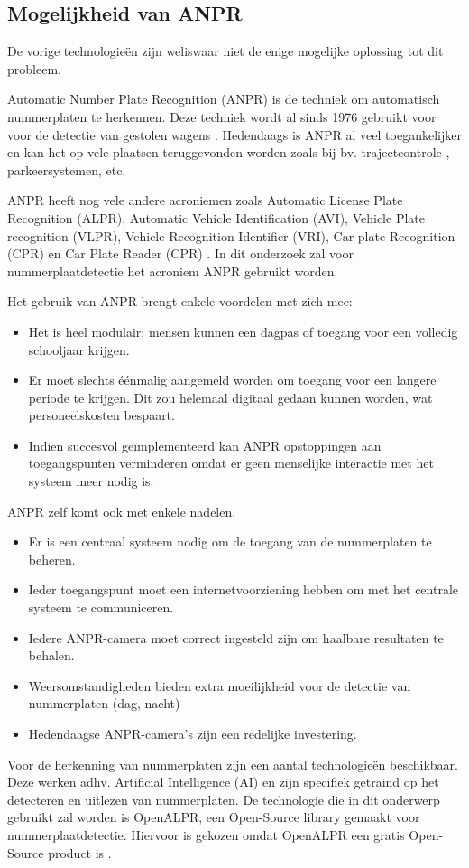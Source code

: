 \subsection{Mogelijkheid van ANPR}
De vorige technologieën zijn weliswaar niet de enige mogelijke oplossing tot dit probleem.

Automatic Number Plate Recognition (ANPR) is de techniek om automatisch nummerplaten te herkennen. Deze techniek wordt al sinds 1976 gebruikt voor voor de detectie van gestolen wagens \autocite{uk2011anpr}. Hedendaags is ANPR al veel toegankelijker en kan het op vele plaatsen teruggevonden worden zoals bij bv. trajectcontrole \autocite{de2014snelheidscamera}, parkeersystemen, etc.
\par
ANPR heeft nog vele andere acroniemen zoals Automatic License Plate Recognition (ALPR), Automatic Vehicle Identification (AVI), Vehicle Plate recognition (VLPR), Vehicle Recognition Identifier (VRI), Car plate Recognition (CPR) en Car Plate Reader (CPR) \autocite{axis2019license}. In dit onderzoek zal voor nummerplaatdetectie het acroniem ANPR gebruikt worden.
\par
Het gebruik van ANPR brengt enkele voordelen met zich mee:
\begin{itemize}
	\item Het is heel modulair; mensen kunnen een dagpas of toegang voor een volledig schooljaar krijgen.
	\item Er moet slechts éénmalig aangemeld worden om toegang voor een langere periode te krijgen. Dit zou helemaal digitaal gedaan kunnen worden, wat personeelskosten bespaart.
	\item Indien succesvol geïmplementeerd kan ANPR opstoppingen aan toegangspunten verminderen omdat er geen menselijke interactie met het systeem meer nodig is.
\end{itemize}
\par
ANPR zelf komt ook met enkele nadelen.
\begin{itemize}
	\item Er is een centraal systeem nodig om de toegang van de nummerplaten te beheren.
	\item Ieder toegangspunt moet een internetvoorziening hebben om met het centrale systeem te communiceren.
	\item Iedere ANPR-camera moet correct ingesteld zijn om haalbare resultaten te behalen.
	\item Weersomstandigheden bieden extra moeilijkheid voor de detectie van nummerplaten (dag, nacht)
	\item Hedendaagse ANPR-camera's zijn een redelijke investering.
\end{itemize}
\par
Voor de herkenning van nummerplaten zijn een aantal technologieën beschikbaar. Deze werken adhv. Artificial Intelligence (AI) en zijn specifiek getraind op het detecteren en uitlezen van nummerplaten.
De technologie die in dit onderwerp gebruikt zal worden is OpenALPR, een Open-Source library gemaakt voor nummerplaatdetectie. Hiervoor is gekozen omdat OpenALPR een gratis Open-Source product is \autocite{openalprgithub}.


